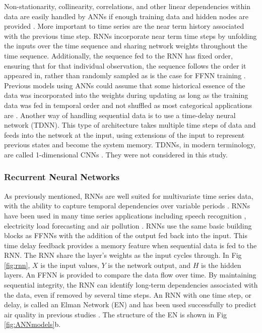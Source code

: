 Non-stationarity, collinearity, correlations, and other linear dependencies within data are easily handled by ANNs if enough training data and hidden nodes are provided \citep{Goodfellow2016}. More important to time series are the near term history associated with the previous time step. RNNs incorporate near term time steps by unfolding the inputs over the time sequence and sharing network weights throughout the time sequence. Additionally, the sequence fed to the RNN has fixed order, ensuring that for that individual observation, the sequence follows the order it appeared in, rather than randomly sampled as is the case for FFNN training \citep{Elangasinghe2014}. Previous models using ANNs could assume that some historical essence of the data was incorporated into the weights during updating as long as the training data was fed in temporal order and not shuffled as most categorical applications are \citep{Bengio2012}. Another way of handling sequential data is to use a time-delay neural network (TDNN). This type of architecture takes multiple time steps of data and feeds into the network at the input, using extensions of the input to represent previous states and become the system memory. TDNNs, in modern terminology, are called 1-dimensional CNNs \citep{Goodfellow2016}. They were not considered in this study.

\subsubsection{Recurrent Neural Networks}
As previously mentioned, RNNs are well suited for multivariate time series data, with the ability to capture temporal dependencies over variable periods \citep{Che2016}. RNNs have been used in many time series applications including speech recognition \citep{Graves2013}, electricity load forecasting \citep{Walid2017} and air pollution \citep{Gomez2003, Fan2017}. RNNs use the same basic building blocks as FFNNs with the addition of the output fed back into the input. This time delay feedback provides a memory feature when sequential data is fed to the RNN. The RNN share the layer's weights as the input cycles through. In Fig \ref{fig:rnn}, $X$ is the input values, $Y$ is the network output, and $H$ is the hidden layers. An FFNN is provided to compare the data flow over time. By maintaining sequential integrity, the RNN can identify long-term dependencies associated with the data, even if removed by several time steps. An RNN with one time step, or delay, is called an Elman Network (EN) and has been used successfully to predict air quality in previous studies \citep{Biancofiore2015, Biancofiore2017}. The structure of the EN is shown in Fig \ref{fig:ANNmodels}b.

